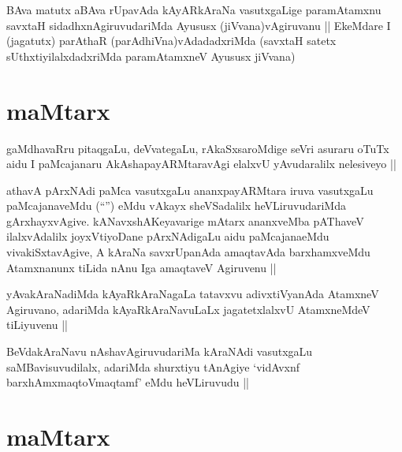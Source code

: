 
\begin{artha}
BAva matutx aBAva rUpavAda kAyARkAraNa vasutxgaLige paramAtamxnu
savxtaH sidadhxnAgiruvudariMda Ayususx (jiVvana)vAgiruvanu || EkeMdare
I (jagatutx) parAthaR (parAdhiVna)vAdadadxriMda (savxtaH satetx
sUthxtiyilalxdadxriMda paramAtamxneV Ayususx jiVvana) 
\end{artha}

\section*{maMtarx}

\stext


\begin{artha}
gaMdhavaRru pitaqgaLu, deVvategaLu, rAkaSxsaroMdige seVri asuraru
oTuTx aidu I paMcajanaru AkAshapayARMtaravAgi elalxvU yAvudaralilx
nelesiveyo ||
\end{artha}

\begin{artha}
athavA pArxNAdi paMca vasutxgaLu ananxpayARMtara iruva vasutxgaLu
paMcajanaveMdu (``\stext'') eMdu vAkayx sheVSadalilx heVLiruvudariMda
gArxhayxvAgive. kANavxshAKeyavarige mAtarx ananxveMba pAThaveV
ilalxvAdalilx joyxVtiyoDane pArxNAdigaLu aidu paMcajanaeMdu
vivakiSxtavAgive, A kAraNa savxrUpanAda amaqtavAda barxhamxveMdu
Atamxnanunx tiLida nAnu Iga amaqtaveV Agiruvenu ||
\end{artha}

\begin{artha}
yAvakAraNadiMda kAyaRkAraNagaLa tatavxvu adivxtiVyanAda AtamxneV
Agiruvano, adariMda kAyaRkAraNavuLaLx jagatetxlalxvU AtamxneMdeV
tiLiyuvenu ||
\end{artha}


\begin{artha}
BeVdakAraNavu nAshavAgiruvudariMa kAraNAdi vasutxgaLu
saMBavisuvudilalx, adariMda shurxtiyu tAnAgiye `vidAvxnf
barxhAmxmaqtoV\s maqtamf' eMdu heVLiruvudu ||
\end{artha}

\section*{maMtarx}

